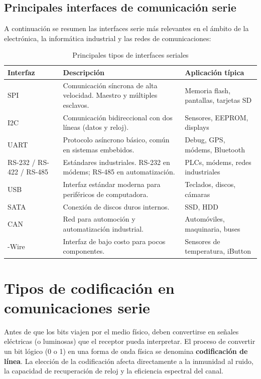 \subsection{Principales interfaces de comunicación serie}

A continuación se resumen las interfaces serie más relevantes en el ámbito de la electrónica, la informática industrial y las redes de comunicaciones:

\begin{table}[H]
\centering
\footnotesize
\caption{Principales tipos de interfaces seriales}
\begin{tabularx}{\textwidth}{@{}>{\raggedright\arraybackslash}p{2.5cm}>{\raggedright\arraybackslash}X>{\raggedright\arraybackslash}p{3.5cm}@{}}
\toprule
\textbf{Interfaz} & \textbf{Descripción} & \textbf{Aplicación típica} \\
\midrule
SPI & Comunicación síncrona de alta velocidad. Maestro y múltiples esclavos. & Memoria flash, pantallas, tarjetas SD \\
I2C & Comunicación bidireccional con dos líneas (datos y reloj). & Sensores, EEPROM, displays \\
UART & Protocolo asíncrono básico, común en sistemas embebidos. & Debug, GPS, módems, Bluetooth \\
RS-232 / RS-422 / RS-485 & Estándares industriales. RS-232 en módems; RS-485 en automatización. & PLCs, módems, redes industriales \\
USB & Interfaz estándar moderna para periféricos de computadora. & Teclados, discos, cámaras \\
SATA & Conexión de discos duros internos. & SSD, HDD \\
CAN & Red para automoción y automatización industrial. & Automóviles, maquinaria, buses \\
1-Wire & Interfaz de bajo costo para pocos componentes. & Sensores de temperatura, iButton \\
\bottomrule
\end{tabularx}
\end{table}


\section{Tipos de codificación en comunicaciones serie}

Antes de que los bits viajen por el medio físico, deben convertirse en señales eléctricas (o luminosas) que el receptor pueda interpretar. El proceso de convertir un bit lógico (0 o 1) en una forma de onda física se denomina \textbf{codificación de línea}. La elección de la codificación afecta directamente a la inmunidad al ruido, la capacidad de recuperación de reloj y la eficiencia espectral del canal.

